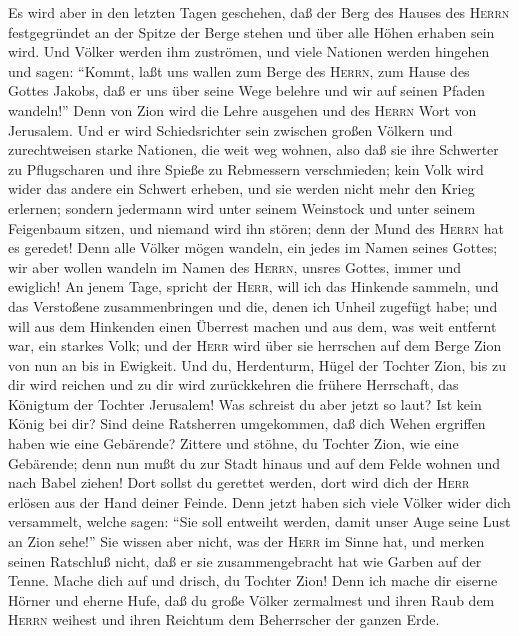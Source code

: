  Es wird aber in den letzten Tagen geschehen, daß der Berg
des Hauses des \textsc{Herrn} festgegründet an der Spitze der Berge
stehen und über alle Höhen erhaben sein wird.  Und Völker
werden ihm zuströmen, und viele Nationen werden hingehen und sagen:
``Kommt, laßt uns wallen zum Berge des \textsc{Herrn}, zum Hause des
Gottes Jakobs, daß er uns über seine Wege belehre und wir auf seinen
Pfaden wandeln!'' Denn von Zion wird die Lehre ausgehen und des
\textsc{Herrn} Wort von Jerusalem.  Und er wird
Schiedsrichter sein zwischen großen Völkern und zurechtweisen starke
Nationen, die weit weg wohnen, also daß sie ihre Schwerter zu
Pflugscharen und ihre Spieße zu Rebmessern verschmieden; kein Volk wird
wider das andere ein Schwert erheben, und sie werden nicht mehr den
Krieg erlernen;  sondern jedermann wird unter seinem
Weinstock und unter seinem Feigenbaum sitzen, und niemand wird ihn
stören; denn der Mund des \textsc{Herrn} hat es geredet! 
Denn alle Völker mögen wandeln, ein jedes im Namen seines Gottes; wir
aber wollen wandeln im Namen des \textsc{Herrn}, unsres Gottes, immer
und ewiglich!  An jenem Tage, spricht der \textsc{Herr},
will ich das Hinkende sammeln, und das Verstoßene zusammenbringen und
die, denen ich Unheil zugefügt habe;  und will aus dem
Hinkenden einen Überrest machen und aus dem, was weit entfernt war, ein
starkes Volk; und der \textsc{Herr} wird über sie herrschen auf dem
Berge Zion von nun an bis in Ewigkeit.  Und du,
Herdenturm, Hügel der Tochter Zion, bis zu dir wird reichen und zu dir
wird zurückkehren die frühere Herrschaft, das Königtum der Tochter
Jerusalem!  Was schreist du aber jetzt so laut? Ist kein
König bei dir? Sind deine Ratsherren umgekommen, daß dich Wehen
ergriffen haben wie eine Gebärende?  Zittere und stöhne,
du Tochter Zion, wie eine Gebärende; denn nun mußt du zur Stadt hinaus
und auf dem Felde wohnen und nach Babel ziehen! Dort sollst du gerettet
werden, dort wird dich der \textsc{Herr} erlösen aus der Hand deiner
Feinde.  Denn jetzt haben sich viele Völker wider dich
versammelt, welche sagen: ``Sie soll entweiht werden, damit unser Auge
seine Lust an Zion sehe!''  Sie wissen aber nicht, was
der \textsc{Herr} im Sinne hat, und merken seinen Ratschluß nicht, daß
er sie zusammengebracht hat wie Garben auf der Tenne. 
Mache dich auf und drisch, du Tochter Zion! Denn ich mache dir eiserne
Hörner und eherne Hufe, daß du große Völker zermalmest und ihren Raub
dem \textsc{Herrn} weihest und ihren Reichtum dem Beherrscher der ganzen
Erde.

